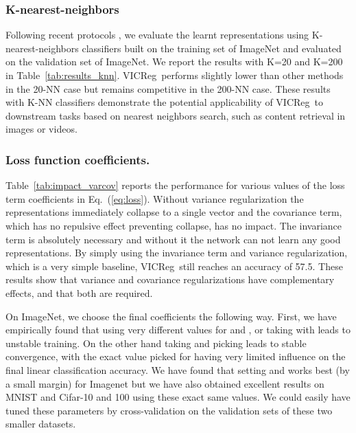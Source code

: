 \documentclass{article}
\newcommand{\algo}{VICReg}
\begin{document}
\subsubsection{K-nearest-neighbors}

Following recent protocols \cite{caron2020swav, wu2018discrimination, zhuang2019local}, we evaluate the learnt representations using K-nearest-neighbors classifiers built on the training set of ImageNet and evaluated on the validation set of ImageNet. We report the results with K=20 and K=200 in Table~\ref{tab:results_knn}. \algo \ performs slightly lower than other methods in the 20-NN case but remains competitive in the 200-NN case. These results with K-NN classifiers demonstrate the potential applicability of \algo \ to downstream tasks based on nearest neighbors search, such as content retrieval in images or videos.

\subsubsection{Loss function coefficients.} \label{app:loss_coeffs}
Table~\ref{tab:impact_varcov} reports the performance for various values of the loss term coefficients in Eq.~(\ref{eq:loss}). Without variance regularization the representations immediately collapse to a single vector and the covariance term, which has no repulsive effect preventing collapse, has no impact. The invariance term is absolutely necessary and without it the network can not learn any good representations. By simply using the invariance term and variance regularization, which is a very simple baseline, \algo \ still reaches an accuracy of 57.5. These results show that variance and covariance regularizations have complementary effects, and that both are required.

On ImageNet, we choose the final coefficients the following way. First, we have empirically found that using very different values for  and , or taking  with  leads to unstable training. On the other hand taking  and picking  leads to stable convergence, with the exact value picked for  having very limited influence on the final linear classification accuracy. We have found that setting  and  works best (by a small margin) for Imagenet but we have also obtained excellent results on MNIST and Cifar-10 and 100 using these exact same values. We could easily have tuned these parameters by cross-validation on the validation sets of these two smaller datasets.
\end{document}
